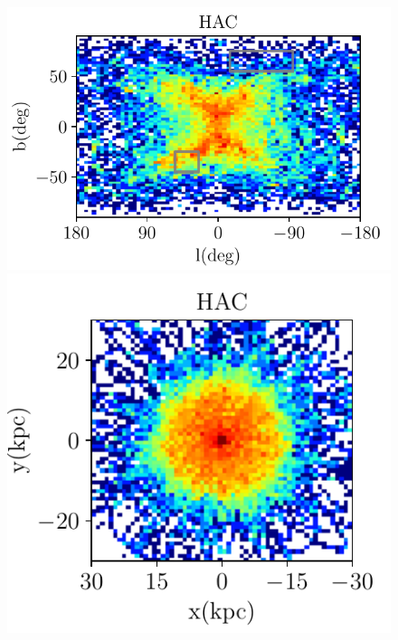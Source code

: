 \documentclass[fleqn,usenatbib]{mnras}
\begin{document}
\begin{figure}

	     \includegraphics[scale=0.52]{HAC_orbits_8Gyrs_lb_defaultmass.pdf}
	     	     \includegraphics[scale=0.52]{HAC_orbits_8Gyrs_xy_defaultmass.pdf}

\end{figure}
\end{document}
